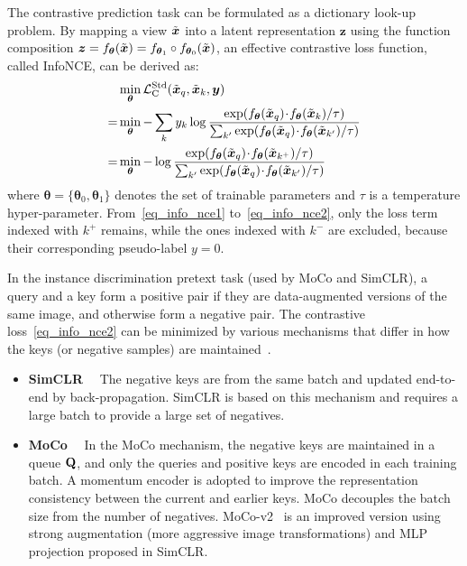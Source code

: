 \documentclass[10pt,twocolumn,letterpaper]{article}
\newcommand{\Qmat}[0]{{{\bf Q}}\xspace}
\newcommand{\xv}{\boldsymbol{x}}
\newcommand{\yv}{\boldsymbol{y}}
\newcommand{\zv}{\boldsymbol{z}}
\newcommand{\thetav}{\boldsymbol{\theta}}
\newcommand{\Lcal}{\mathcal{L}}
\begin{document}
The contrastive prediction task can be formulated as a dictionary look-up problem. By mapping a view $\Tilde{\xv}$ into a latent representation $\zv$ using the function composition $\zv = f_{\thetav} (\Tilde{\xv})= f_{\thetav_1} \circ f_{\thetav_0} (\Tilde{\xv})$,
an effective contrastive loss function, called InfoNCE, can be derived as:
\begin{align} 
\hspace{-0mm}
& \min_{\thetav} \Lcal^{\text{Std}}_{\text{C}} ( \Tilde{\xv}_q, \Tilde{\xv}_{k}, \yv) \nonumber\\
=& \min_{\thetav} - \sum_{k} y_k \log \frac{\exp(f_{\thetav} (\Tilde{\xv}_q) \! \cdot\! f_{\thetav} (\Tilde{\xv}_{ k})/\tau)}{ \sum_{k'}\exp(f_{\thetav} (\Tilde{\xv}_q) \!\cdot\! f_{\thetav} (\Tilde{\xv}_{k'}) /\tau) }  
\label{eq_info_nce1} \\
=& \min_{\thetav}  -\log \frac{\exp(f_{\thetav} (\Tilde{\xv}_q) \! \cdot\! f_{\thetav} (\Tilde{\xv}_{ k^+})/\tau)}{ \sum_{k'}\exp(f_{\thetav} (\Tilde{\xv}_q) \!\cdot\! f_{\thetav} (\Tilde{\xv}_{k'}) /\tau) }
\label{eq_info_nce2}
\end{align}
where $\thetav = \{\thetav_0, \thetav_1\}$ denotes the set of  trainable parameters  and $\tau$ is a temperature hyper-parameter. From~\eqref{eq_info_nce1} to~\eqref{eq_info_nce2}, only the loss term indexed with $ k^+$ remains, while the ones indexed with $k^-$ are excluded, because their corresponding pseudo-label $y=0$.

In the instance discrimination pretext task (used by MoCo and SimCLR), a query and a key form a positive pair if they are data-augmented versions of the same image, and otherwise form a negative pair.
The contrastive loss~\eqref{eq_info_nce2} can be minimized by various
mechanisms that differ in how the keys (or negative samples) are maintained~\cite{chen2020improved}.

\begin{itemize}\vspace{1mm}
    \item {\bf SimCLR}~\cite{chen2020simple}~ The negative keys are from the same batch and updated end-to-end by back-propagation. SimCLR is based on this
mechanism and requires a large batch to provide a large set
of negatives. 
    \vspace{-0mm}
    \item  {\bf MoCo}~\cite{he2020momentum,chen2020improved}~
In the MoCo mechanism, the negative keys are maintained in a queue $\Qmat$, and only the queries and positive keys are encoded in each training batch. A momentum encoder is adopted to improve the representation consistency between the current and earlier keys. MoCo decouples the batch size from the number of negatives. MoCo-v2~\cite{chen2020improved} is an improved version using strong augmentation (\ie more aggressive image transformations) and MLP projection proposed in SimCLR.
    \vspace{-6mm}
\end{itemize}
\end{document}
